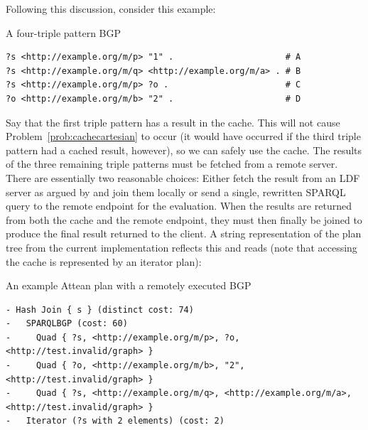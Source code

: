 Following this discussion, consider this example:
\begin{example}{A four-triple pattern BGP}\label{ex:bgp4}
\begin{verbatim}
?s <http://example.org/m/p> "1" .                      # A
?s <http://example.org/m/q> <http://example.org/m/a> . # B
?s <http://example.org/m/p> ?o .                       # C
?o <http://example.org/m/b> "2" .                      # D
\end{verbatim}
\end{example}
Say that the first triple pattern has a result in the cache. This will
not cause Problem~\ref{prob:cachecartesian} to occur (it would have
occurred if the third triple pattern had a cached result, however), so
we can safely use the cache. The results of the three remaining triple
patterns must be fetched from a remote server. There are essentially
two reasonable choices: Either fetch the result from an LDF server as
argued by \cite{verborgh2014querying} and join them locally or send a
single, rewritten SPARQL query to the remote endpoint for the
evaluation. When the results are returned from both the cache and the
remote endpoint, they must then finally be joined to produce the final
result returned to the client. A string representation of the plan
tree from the current implementation reflects this and reads (note
that accessing the cache is represented by an iterator plan):
\begin{example}{An example Attean plan with a remotely executed BGP}
\begin{verbatim}
- Hash Join { s } (distinct cost: 74)
-   SPARQLBGP (cost: 60)
-     Quad { ?s, <http://example.org/m/p>, ?o, <http://test.invalid/graph> }
-     Quad { ?o, <http://example.org/m/b>, "2", <http://test.invalid/graph> }
-     Quad { ?s, <http://example.org/m/q>, <http://example.org/m/a>, <http://test.invalid/graph> }
-   Iterator (?s with 2 elements) (cost: 2)
\end{verbatim}
\end{example}

